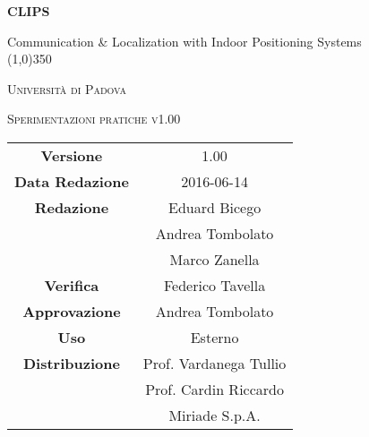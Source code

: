 \documentclass[a4paper,12pt]{article}
\author{}
\date{9/12/2015}
\begin{document}
	\begin{titlepage}
		\centering
		{\huge\bfseries CLIPS\par}
	Communication \& Localization with Indoor Positioning Systems \\
	\line(1,0){350} \\
	{\scshape\LARGE Università di Padova \par}
	\vspace{1cm}
	{\scshape\Large Sperimentazioni pratiche v1.00\par}
	\logo
	\newpage
		\begin{tabular}{c|c}
			{\hfill \textbf{Versione}} 		& 1.00				\\
			{\hfill\textbf{Data Redazione}} 	& 2016-06-14	  		\\
			{\hfill\textbf{Redazione}}		& Eduard Bicego \\
											& Andrea Tombolato  \\
											& Marco Zanella		\\
			{\hfill\textbf{Verifica}} 		& Federico Tavella		\\
			{\hfill\textbf{Approvazione}} 		& Andrea Tombolato		\\
			{\hfill\textbf{Uso}} 			& Esterno			\\
			{\hfill\textbf{Distribuzione}} 		& Prof. Vardanega Tullio 	\\
								& Prof. Cardin Riccardo 	\\
								& Miriade S.p.A. 		\\
		\end{tabular}
	\end{titlepage}
	\newpage
		\pagestyle{myfront}
		

	\newpage
		\tableofcontents
	\newpage
		\listoftables
	\newpage
		\listoffigures
	\label{LastFrontPage}

	\newpage
	\pagestyle{mymain}
				
		
	\newpage
		
		
	\newpage
		
		
	\newpage
				
		
	\newpage
		
		
	\newpage
		
		
	
	\newpage
		
		
	\newpage
		
		
	\label{LastPage}
\end{document}
